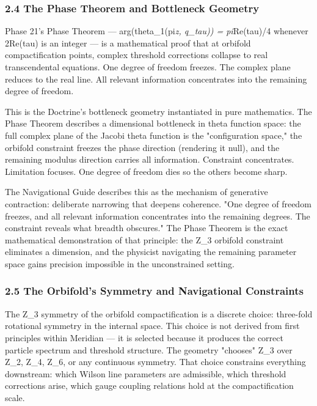 \subsubsection*{2.4 The Phase Theorem and Bottleneck Geometry}


Phase 21's Phase Theorem — arg(theta\_1(pi\textit{z, q\_tau)) = pi}Re(tau)/4 whenever 2Re(tau) is an integer — is a mathematical proof that at orbifold compactification points, complex threshold corrections collapse to real transcendental equations. One degree of freedom freezes. The complex plane reduces to the real line. All relevant information concentrates into the remaining degree of freedom.


This is the Doctrine's bottleneck geometry instantiated in pure mathematics. The Phase Theorem describes a dimensional bottleneck in theta function space: the full complex plane of the Jacobi theta function is the "configuration space," the orbifold constraint freezes the phase direction (rendering it null), and the remaining modulus direction carries all information. Constraint concentrates. Limitation focuses. One degree of freedom dies so the others become sharp.


The Navigational Guide describes this as the mechanism of generative contraction: deliberate narrowing that deepens coherence. "One degree of freedom freezes, and all relevant information concentrates into the remaining degrees. The constraint reveals what breadth obscures." The Phase Theorem is the exact mathematical demonstration of that principle: the Z\_3 orbifold constraint eliminates a dimension, and the physicist navigating the remaining parameter space gains precision impossible in the unconstrained setting.


\subsubsection*{2.5 The Orbifold's Symmetry and Navigational Constraints}


The Z\_3 symmetry of the orbifold compactification is a discrete choice: three-fold rotational symmetry in the internal space. This choice is not derived from first principles within Meridian — it is selected because it produces the correct particle spectrum and threshold structure. The geometry "chooses" Z\_3 over Z\_2, Z\_4, Z\_6, or any continuous symmetry. That choice constrains everything downstream: which Wilson line parameters are admissible, which threshold corrections arise, which gauge coupling relations hold at the compactification scale.


